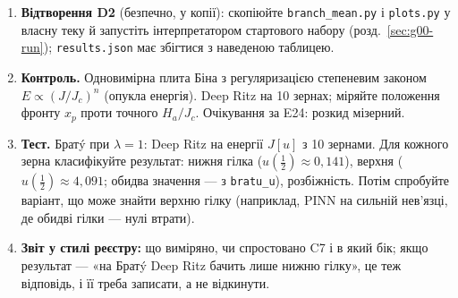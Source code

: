 \begin{practicum}
\begin{enumerate}
\item \textbf{Відтворення D2} (безпечно, у копії):
  скопіюйте \texttt{branch\_mean.py} і \texttt{plots.py} у власну теку й запустіть
  інтерпретатором стартового набору (розд.~\ref{sec:g00-run}); \texttt{results.json} має
  збігтися з наведеною таблицею.
\item \textbf{Контроль.} Одновимірна плита Біна з регуляризацією степеневим законом
  $E\propto(J/J_c)^n$ (опукла енергія). Deep Ritz на 10 зернах; міряйте положення фронту
  $x_p$ проти точного $H_a/J_c$. Очікування за E24: розкид мізерний.
\item \textbf{Тест.} Братý при $\lambda=1$: Deep Ritz на енергії $J[u]$ з 10 зернами. Для
  кожного зерна класифікуйте результат: нижня гілка ($u(\tfrac12)\approx0{,}141$),
  верхня ($u(\tfrac12)\approx4{,}091$; обидва значення --- з \texttt{bratu\_u}), розбіжність. Потім спробуйте варіант, що може знайти
  верхню гілку (наприклад, PINN на сильній нев'язці, де обидві гілки --- нулі втрати).
\item \textbf{Звіт у стилі реєстру:} що виміряно, чи спростовано C7 і в який бік; якщо
  результат --- «на Братý Deep Ritz бачить лише нижню гілку», це теж відповідь, і її треба
  записати, а не відкинути.
\end{enumerate}
\end{practicum}
